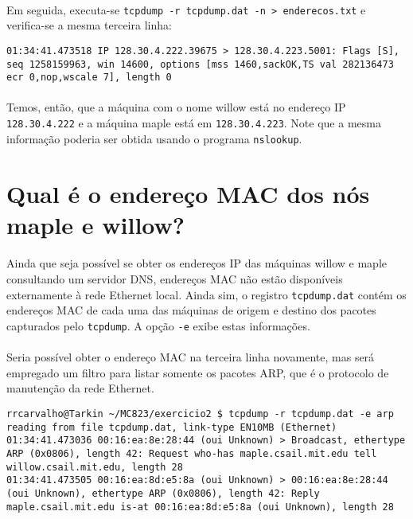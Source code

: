 \documentclass[a4paper,10pt,oneside,final,titlepage,onecolumn]{article}
\begin{document}
\paragraph{}Em seguida, executa-se \verb|tcpdump -r tcpdump.dat -n > enderecos.txt| e verifica-se a mesma terceira linha:
\begin{lstlisting}
01:34:41.473518 IP 128.30.4.222.39675 > 128.30.4.223.5001: Flags [S], seq 1258159963, win 14600, options [mss 1460,sackOK,TS val 282136473 ecr 0,nop,wscale 7], length 0
\end{lstlisting}
\paragraph{}Temos, então, que a máquina com o nome willow está no endereço IP \verb|128.30.4.222| e a máquina maple está em \verb|128.30.4.223|. Note que a mesma informação poderia ser obtida usando o programa \verb|nslookup|.



\section{Qual é o endereço MAC dos nós maple e willow? }
\paragraph{}Ainda que seja possível se obter os endereços IP das máquinas willow e maple consultando um servidor DNS, endereços MAC não estão disponíveis externamente à rede Ethernet local. Ainda sim, o registro \verb|tcpdump.dat| contém os endereços MAC de cada uma das máquinas de origem e destino dos pacotes capturados pelo \verb|tcpdump|. A opção \verb|-e| exibe estas informações.
\paragraph{}Seria possível obter o endereço MAC na terceira linha novamente, mas será empregado um filtro para listar somente os pacotes ARP, que é o protocolo de manutenção da rede Ethernet.
\begin{lstlisting}
rrcarvalho@Tarkin ~/MC823/exercicio2 $ tcpdump -r tcpdump.dat -e arp
reading from file tcpdump.dat, link-type EN10MB (Ethernet)
01:34:41.473036 00:16:ea:8e:28:44 (oui Unknown) > Broadcast, ethertype ARP (0x0806), length 42: Request who-has maple.csail.mit.edu tell willow.csail.mit.edu, length 28
01:34:41.473505 00:16:ea:8d:e5:8a (oui Unknown) > 00:16:ea:8e:28:44 (oui Unknown), ethertype ARP (0x0806), length 42: Reply maple.csail.mit.edu is-at 00:16:ea:8d:e5:8a (oui Unknown), length 28
\end{lstlisting}
\end{document}
